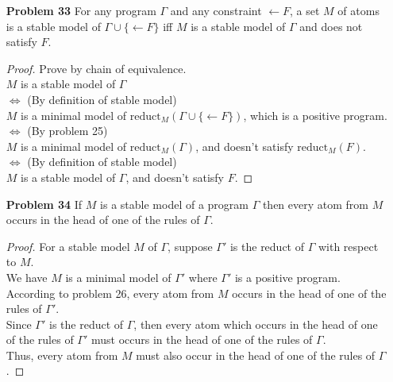 \begin{enumerate}
\item[\textbf{Problem 33}] For any program $\Gamma$ and any constraint $\leftarrow F$, a set $M$ of atoms is a stable model of $\Gamma \cup \{\leftarrow F\}$ iff $M$ is a stable model of $\Gamma$ and does not satisfy $F$. 
\begin{proof} Prove by chain of equivalence.\\
$M$ is a stable model of $\Gamma$ \\
$\iff$  (By definition of stable model) \\
$M$ is a minimal model of $\text{reduct}_M(\Gamma \cup \{\leftarrow F\})$, which is a positive program. \\
$\iff$ (By problem 25) \\
$M$ is a minimal model of $\text{reduct}_M(\Gamma)$, and doesn't satisfy $\text{reduct}_M(F)$. \\
$\iff$  (By definition of stable model) \\
$M$ is a stable model of $\Gamma$, and doesn't satisfy $F$. 
\end{proof}


\item[\textbf{Problem 34}] If $M$ is a stable model of a program $\Gamma$ then every atom from $M$ occurs in the head of one of the rules of $\Gamma$. 
\begin{proof}
For a stable model $M$ of $\Gamma$, suppose $\Gamma'$ is the reduct of $\Gamma$ with respect to $M$. \\
We have $M$ is a minimal model of $\Gamma'$ where $\Gamma'$ is a positive program. \\
According to problem 26, every atom from $M$ occurs in the head of one of the rules of $\Gamma'$. \\
Since $\Gamma'$ is the reduct of $\Gamma$, then every atom which occurs in the head of one of the rules of $\Gamma'$ must occurs in the head of one of the rules of $\Gamma$. \\
Thus, every atom from $M$ must also occur in the head of one of the rules of $\Gamma$. 
\end{proof}
\end{enumerate}

